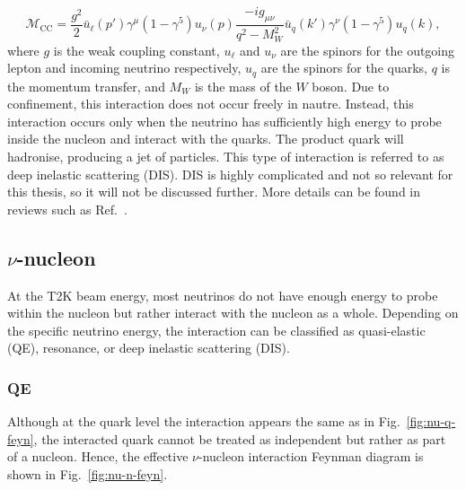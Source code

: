 \begin{equation}
  \mathcal{M}_{\text{CC}} = \frac{g^2}{2} \bar{u}_\ell(p') \gamma^\mu (1 - \gamma^5) u_\nu(p) \frac{-i g_{\mu\nu}}{q^2 - M_W^2} \bar{u}_q(k') \gamma^\nu (1 - \gamma^5) u_q(k),
\end{equation}
where $g$ is the weak coupling constant, $u_\ell$ and $u_\nu$ are the spinors for the outgoing lepton and incoming neutrino respectively, $u_q$ are the spinors for the quarks, $q$ is the momentum transfer, and $M_W$ is the mass of the $W$ boson.
Due to confinement, this interaction does not occur freely in nautre.
Instead, this interaction occurs only when the neutrino has sufficiently high energy to probe inside the nucleon and interact with the quarks.
The product quark will hadronise, producing a jet of particles.
This type of interaction is referred to as deep inelastic scattering (DIS).
DIS is highly complicated and not so relevant for this thesis, so it will not be discussed further.
More details can be found in reviews such as Ref.~\cite{SajjadAthar:2022pjt}.

\subsection{$\nu$-nucleon}
At the T2K beam energy, most neutrinos do not have enough energy to probe within the nucleon but rather interact with the nucleon as a whole.
Depending on the specific neutrino energy, the interaction can be classified as quasi-elastic (QE), resonance, or deep inelastic scattering (DIS).

\subsubsection{QE}
Although at the quark level the interaction appears the same as in Fig.~\ref{fig:nu-q-feyn}, the interacted quark cannot be treated as independent but rather as part of a nucleon.
Hence, the effective $\nu$-nucleon interaction Feynman diagram is shown in Fig.~\ref{fig:nu-n-feyn}.

